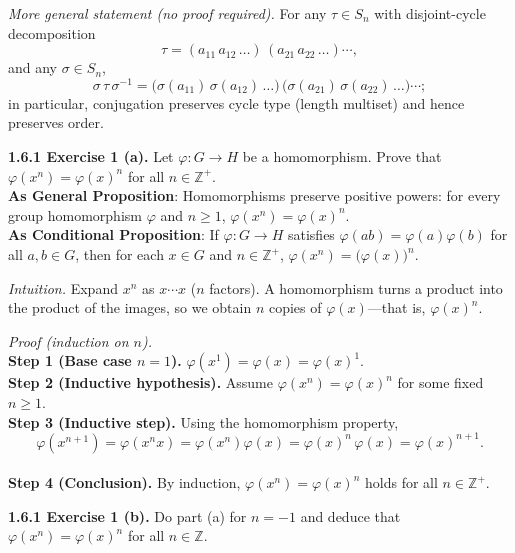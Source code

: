 \documentclass[12pt]{article}
\theoremstyle{definition}
\begin{document}
\medskip
\noindent\emph{More general statement (no proof required).} For any $\tau\in S_n$ with disjoint-cycle decomposition
\[
\tau=(a_{11}\,a_{12}\,\dots)\,(a_{21}\,a_{22}\,\dots)\cdots,
\]
and any $\sigma\in S_n$,
\[
\sigma\,\tau\,\sigma^{-1}
=
\big(\sigma(a_{11})\,\sigma(a_{12})\,\dots\big)\,
\big(\sigma(a_{21})\,\sigma(a_{22})\,\dots\big)\cdots;
\]
in particular, conjugation preserves cycle type (length multiset) and hence preserves order.

\newpage

\noindent \textbf{1.6.1 Exercise 1 (a).} Let $\varphi:G\to H$ be a homomorphism. Prove that $\varphi(x^n)=\varphi(x)^n$ for all $n\in\mathbb{Z}^+$.\\ %

\noindent\textbf{As General Proposition}: Homomorphisms preserve positive powers: for every group homomorphism $\varphi$ and $n\ge1$, $\varphi(x^n)=\varphi(x)^n$.\\

\noindent \textbf{As Conditional Proposition}: If $\varphi:G\to H$ satisfies $\varphi(ab)=\varphi(a)\varphi(b)$ for all $a,b\in G$, then for each $x\in G$ and $n\in\mathbb{Z}^+$, $\varphi(x^n)=\big(\varphi(x)\big)^n$.

\newpage

\dotfill

\emph{Intuition.} Expand $x^n$ as $x\cdots x$ ($n$ factors). A homomorphism turns a product into the product of the images, so we obtain $n$ copies of $\varphi(x)$—that is, $\varphi(x)^n$.\\

\dotfill

\emph{Proof (induction on $n$).}\\
\textbf{Step 1 (Base case $n=1$).} $\varphi(x^1)=\varphi(x)=\varphi(x)^1$.\\
\textbf{Step 2 (Inductive hypothesis).} Assume $\varphi(x^n)=\varphi(x)^n$ for some fixed $n\ge1$.\\
\textbf{Step 3 (Inductive step).} Using the homomorphism property,
\[
\varphi(x^{n+1})=\varphi(x^n x)=\varphi(x^n)\varphi(x)=\varphi(x)^n\,\varphi(x)=\varphi(x)^{n+1}.
\]
\\
\textbf{Step 4 (Conclusion).} By induction, $\varphi(x^n)=\varphi(x)^n$ holds for all $n\in\mathbb{Z}^+$.\\


\newpage

\noindent \textbf{1.6.1 Exercise 1 (b).} Do part (a) for $n=-1$ and deduce that $\varphi(x^n)=\varphi(x)^n$ for all $n\in\mathbb{Z}$.\\ %
\end{document}
